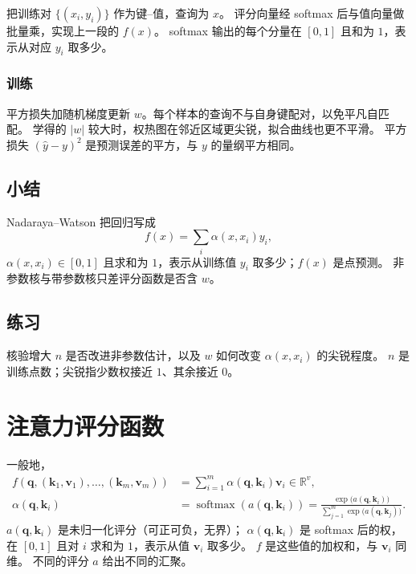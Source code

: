 把训练对 $\{(x_i,y_i)\}$ 作为键--值，查询为 $x$。
评分向量经 softmax 后与值向量做批量乘，实现上一段的 $f(x)$。
softmax 输出的每个分量在 $[0,1]$ 且和为 $1$，表示从对应 $y_i$ 取多少。

\subsubsection{训练}

平方损失加随机梯度更新 $w$。每个样本的查询不与自身键配对，以免平凡自匹配。
学得的 $|w|$ 较大时，权热图在邻近区域更尖锐，拟合曲线也更不平滑。
平方损失 $(\hat{y}-y)^{2}$ 是预测误差的平方，与 $y$ 的量纲平方相同。

\subsection{小结}

Nadaraya--Watson 把回归写成
\[
f(x)=\sum_{i}\alpha(x,x_i)y_i,
\]
$\alpha(x,x_i)\in[0,1]$ 且求和为 $1$，表示从训练值 $y_i$ 取多少；$f(x)$ 是点预测。
非参数核与带参数核只差评分函数是否含 $w$。

\subsection{练习}

核验增大 $n$ 是否改进非参数估计，以及 $w$ 如何改变 $\alpha(x,x_i)$ 的尖锐程度。
$n$ 是训练点数；尖锐指少数权接近 $1$、其余接近 $0$。

\section{注意力评分函数}



一般地，
\begin{align*}
f(\bm{q},(\bm{k}_1,\bm{v}_1),\ldots,(\bm{k}_m,\bm{v}_m))
&=
\sum_{i=1}^{m}\alpha(\bm{q},\bm{k}_i)\bm{v}_i\in\mathbb{R}^{v},
\\
\alpha(\bm{q},\bm{k}_i)
&=
\operatorname{softmax}(a(\bm{q},\bm{k}_i))
=
\frac{\exp\bigl(a(\bm{q},\bm{k}_i)\bigr)}
{\sum_{j=1}^{m}\exp\bigl(a(\bm{q},\bm{k}_j)\bigr)}.
\end{align*}
$a(\bm{q},\bm{k}_i)$ 是未归一化评分（可正可负，无界）；
$\alpha(\bm{q},\bm{k}_i)$ 是 softmax 后的权，在 $[0,1]$ 且对 $i$ 求和为 $1$，表示从值 $\bm{v}_i$ 取多少。
$f$ 是这些值的加权和，与 $\bm{v}_i$ 同维。
不同的评分 $a$ 给出不同的汇聚。

